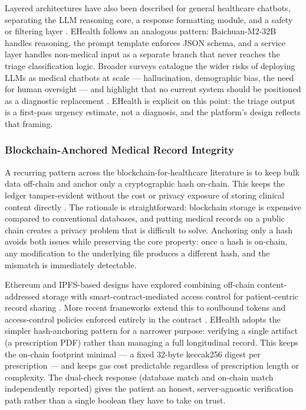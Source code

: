 \noindent Layered architectures have also been described for general healthcare chatbots, separating the LLM reasoning core, a response formatting module, and a safety or filtering layer \cite{healthcare_chatbot_2025}. EHealth follows an analogous pattern: Baichuan-M2-32B handles reasoning, the prompt template enforces JSON schema, and a service layer handles non-medical input as a separate branch that never reaches the triage classification logic. Broader surveys catalogue the wider risks of deploying LLMs as medical chatbots at scale --- hallucination, demographic bias, the need for human oversight --- and highlight that no current system should be positioned as a diagnostic replacement \cite{llm_chatbot_risks_2025}. EHealth is explicit on this point: the triage output is a first-pass urgency estimate, not a diagnosis, and the platform's design reflects that framing.

\subsubsection{Blockchain-Anchored Medical Record Integrity}

A recurring pattern across the blockchain-for-healthcare literature is to keep bulk data off-chain and anchor only a cryptographic hash on-chain. This keeps the ledger tamper-evident without the cost or privacy exposure of storing clinical content directly \cite{medical_blockchain_ehr_2022, blockchain_healthcare_2020}. The rationale is straightforward: blockchain storage is expensive compared to conventional databases, and putting medical records on a public chain creates a privacy problem that is difficult to solve. Anchoring only a hash avoids both issues while preserving the core property: once a hash is on-chain, any modification to the underlying file produces a different hash, and the mismatch is immediately detectable.

\noindent Ethereum and IPFS-based designs have explored combining off-chain content-addressed storage with smart-contract-mediated access control for patient-centric record sharing \cite{blockchain_record_sharing_2025}. More recent frameworks extend this to soulbound tokens and access-control policies enforced entirely in the contract \cite{blockchain_soulbound_2024}. EHealth adopts the simpler hash-anchoring pattern for a narrower purpose: verifying a single artifact (a prescription PDF) rather than managing a full longitudinal record. This keeps the on-chain footprint minimal --- a fixed 32-byte keccak256 digest per prescription --- and keeps gas cost predictable regardless of prescription length or complexity. The dual-check response (database match and on-chain match independently reported) gives the patient an honest, server-agnostic verification path rather than a single boolean they have to take on trust.

